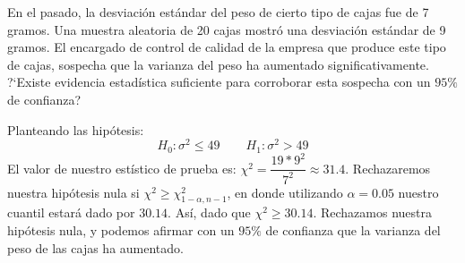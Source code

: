 
\question[15] En el pasado, la desviaci\'on est\'andar del peso de cierto tipo de cajas fue de 7 gramos. Una muestra aleatoria de 20 cajas mostr\'o una desviaci\'on est\'andar de 9 gramos. El encargado de control de calidad de la empresa que produce este tipo de cajas, sospecha que la varianza del peso ha aumentado significativamente. ?`Existe evidencia estad\'istica suficiente para corroborar esta sospecha con un $95\%$ de confianza?

\begin{solution}

Planteando las hip\'otesis:$$H_0: \sigma^2\leq 49\hspace{25pt} H_1: \sigma^2 > 49 $$El valor de nuestro est\'istico de prueba es: $\chi^2=\dfrac{19*9^2}{7^2}\approx 31.4$. Rechazaremos nuestra hip\'otesis nula si $\chi^2\geq \chi_{1-\alpha,n-1}^{2}$, en donde utilizando $\alpha=0.05$ nuestro cuantil estar\'a dado por $30.14$. As\'i, dado que $\chi^2 \geq 30.14$. Rechazamos nuestra hip\'otesis nula, y podemos afirmar con un $95\%$ de confianza que la varianza del peso de las cajas ha aumentado.
\end{solution}
